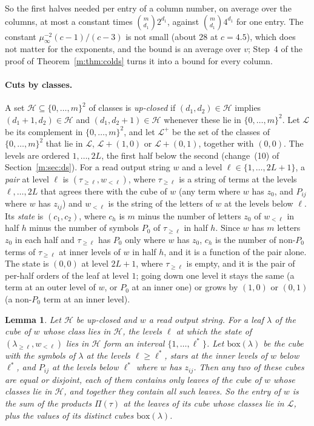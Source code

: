 \documentclass[11pt]{article}
\newtheorem{lemma}[theorem]{Lemma}
\theoremstyle{definition}
\theoremstyle{remark}
\begin{document}
So the first halves needed per entry of a column number, on average over the columns, at most a constant times $\binom m{d_1}2^{d_1}$, against $\binom m{d_1}4^{d_1}$ for one entry. The constant $\mu_\infty^{-2}(c-1)/(c-3)$ is not small (about $28$ at $c=4.5$), which does not matter for the exponents, and the bound is an average over $v$; Step~4 of the proof of Theorem~\ref{m:thm:colds} turns it into a bound for every column.

\paragraph{Cuts by classes.} A set $\mathcal H\subseteq\{0,\dots,m\}^2$ of classes is \emph{up-closed} if $(d_1,d_2)\in\mathcal H$ implies $(d_1+1,d_2)\in\mathcal H$ and $(d_1,d_2+1)\in\mathcal H$ whenever these lie in $\{0,\dots,m\}^2$. Let $\mathcal L$ be its complement in $\{0,\dots,m\}^2$, and let $\mathcal L^+$ be the set of the classes of $\{0,\dots,m\}^2$ that lie in $\mathcal L$, $\mathcal L+(1,0)$ or $\mathcal L+(0,1)$, together with $(0,0)$. The levels are ordered $1,\dots,2L$, the first half below the second (change~(10) of Section~\ref{m:sec:ds}). For a read output string $w$ and a level $\ell\in\{1,\dots,2L+1\}$, a \emph{pair} at level $\ell$ is $(\tau_{\ge\ell},w_{<\ell})$, where $\tau_{\ge\ell}$ is a string of terms at the levels $\ell,\dots,2L$ that agrees there with the cube of $w$ (any term where $w$ has $z_0$, and $P_{ij}$ where $w$ has $z_{ij}$) and $w_{<\ell}$ is the string of the letters of $w$ at the levels below $\ell$. Its \emph{state} is $(c_1,c_2)$, where $c_h$ is $m$ minus the number of letters $z_0$ of $w_{<\ell}$ in half $h$ minus the number of symbols $P_0$ of $\tau_{\ge\ell}$ in half $h$. Since $w$ has $m$ letters $z_0$ in each half and $\tau_{\ge\ell}$ has $P_0$ only where $w$ has $z_0$, $c_h$ is the number of non-$P_0$ terms of $\tau_{\ge\ell}$ at inner levels of $w$ in half $h$, and it is a function of the pair alone. The state is $(0,0)$ at level $2L+1$, where $\tau_{\ge\ell}$ is empty, and it is the pair of per-half orders of the leaf at level $1$; going down one level it stays the same (a term at an outer level of $w$, or $P_0$ at an inner one) or grows by $(1,0)$ or $(0,1)$ (a non-$P_0$ term at an inner level).

\begin{lemma}\label{m:lem:firstentry}
Let $\mathcal H$ be up-closed and $w$ a read output string. For a leaf $\lambda$ of the cube of $w$ whose class lies in $\mathcal H$, the levels $\ell$ at which the state of $(\lambda_{\ge\ell},w_{<\ell})$ lies in $\mathcal H$ form an interval $\{1,\dots,\ell^*\}$. Let $\mathrm{box}(\lambda)$ be the cube with the symbols of $\lambda$ at the levels $\ell\ge\ell^*$, stars at the inner levels of $w$ below $\ell^*$, and $P_{ij}$ at the levels below $\ell^*$ where $w$ has $z_{ij}$. Then any two of these cubes are equal or disjoint, each of them contains only leaves of the cube of $w$ whose classes lie in $\mathcal H$, and together they contain all such leaves. So the entry of $w$ is the sum of the products $\Pi(\tau)$ at the leaves of its cube whose classes lie in $\mathcal L$, plus the values of its distinct cubes $\mathrm{box}(\lambda)$.
\end{lemma}
\end{document}
